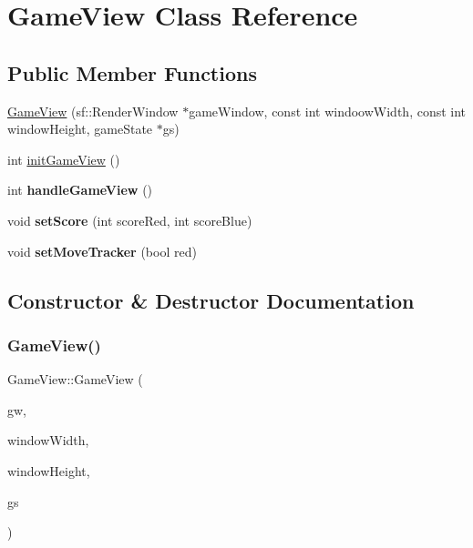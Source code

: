 \hypertarget{classGameView}{}\section{Game\+View Class Reference}
\label{classGameView}
\subsection*{Public Member Functions}
\begin{DoxyCompactItemize}
\item 
\hyperlink{classGameView_a41cabebb48225d25835052e275fa0bce}{Game\+View} (sf\+::\+Render\+Window $\ast$game\+Window, const int windoow\+Width, const int window\+Height, game\+State $\ast$gs)
\item 
int \hyperlink{classGameView_affc208b835faeede0f435197e1440951}{init\+Game\+View} ()
\item 
\mbox{\label{classGameView_a8a93e2963678fc897a231b4b6dae2ee2}} 
int {\bfseries handle\+Game\+View} ()
\item 
\mbox{\label{classGameView_aa1bbff949a105e458f2dbf6c6cc3b9be}} 
void {\bfseries set\+Score} (int score\+Red, int score\+Blue)
\item 
\mbox{\label{classGameView_ad7b959dc103564bdfbc869379386b4c5}} 
void {\bfseries set\+Move\+Tracker} (bool red)
\end{DoxyCompactItemize}


\subsection{Constructor \& Destructor Documentation}
\mbox{\label{classGameView_a41cabebb48225d25835052e275fa0bce}} 
\subsubsection{\texorpdfstring{Game\+View()}{GameView()}}
{\footnotesize\ttfamily Game\+View\+::\+Game\+View (\begin{DoxyParamCaption}\item[{sf\+::\+Render\+Window $\ast$}]{gw,  }\item[{const int}]{window\+Width,  }\item[{const int}]{window\+Height,  }\item[{game\+State $\ast$}]{gs }\end{DoxyParamCaption})}


